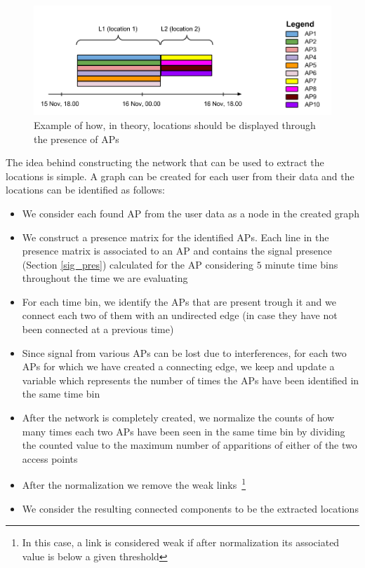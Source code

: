 \begin{figure}[!h]
\centering
\includegraphics[width=1\textwidth]{figures/networks/theoretical_network.png}
\caption{Example of how, in theory, locations should be displayed through the
presence of APs}
\label{user_6_tn}
\end{figure}

The idea behind constructing the network  that can be used to extract the
locations is simple. A graph can be created for each user from their data and
the locations can be identified as follows:
\begin{itemize}
  \item We consider each found AP from the user data as a node in the created
  graph
  \item We construct a presence matrix for the identified APs. Each line in the
  presence matrix is associated to an AP and contains the signal presence
  (Section \ref{sig_pres}) calculated for the AP considering $5$ minute time bins
  throughout the time we are evaluating
  \item For each time bin, we identify the APs that are present trough it and
  we connect each two of them with an undirected edge (in case they have not
  been connected at a previous time)
  \item Since signal from various APs can be lost due to interferences, for each
  two APs for which we have created a connecting edge, we keep and update a
  variable which represents the number of times the APs have been identified in
  the same time bin
  \item After the network is completely created, we normalize the counts of how
  many times each two APs have been seen in the same time bin by dividing the
  counted value to the maximum number of apparitions of either of the two access points
  \item After the normalization we remove the weak links~\footnote{In this
  case, a link is considered weak if after normalization its associated value is
  below a given threshold}
  \item We consider the resulting connected components to be the extracted
  locations
\end{itemize}

